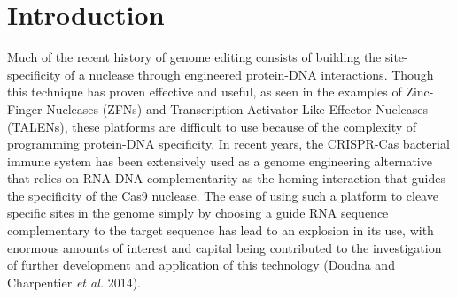 \chapter{Introduction}
\label{introduction}

Much of the recent history of genome editing consists of building the site-specificity of a nuclease through engineered protein-DNA interactions. Though this technique has proven effective and useful, as seen in the examples of Zinc-Finger Nucleases (ZFNs) and Transcription Activator-Like Effector Nucleases (TALENs), these platforms are difficult to use because of the complexity of programming protein-DNA specificity.
In recent years, the CRISPR-Cas bacterial immune system has been extensively used as a genome engineering alternative that relies on RNA-DNA complementarity as the homing interaction that guides the specificity of the Cas9 nuclease. The ease of using such a platform to cleave specific sites in the genome simply by choosing a guide RNA sequence complementary to the target sequence has lead to an explosion in its use, with enormous amounts of interest and capital being contributed to the investigation of further development and application of this technology (Doudna and Charpentier \textit{et al.} 2014).
%
%
